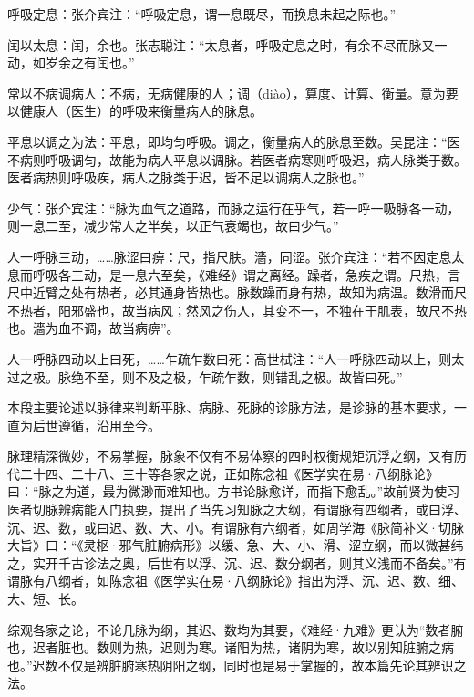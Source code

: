 \documentclass[12pt]{ctexbook}
\begin{document}
\begin{jiaozhu}
  \item 呼吸定息：张介宾注：“呼吸定息，谓一息既尽，而换息未起之际也。”
  \item 闰以太息：闰，余也。张志聪注：“太息者，呼吸定息之时，有余不尽而脉又一动，如岁余之有闰也。”
  \item 常以不病调病人：不病，无病健康的人；调（diào），算度、计算、衡量。意为要以健康人（医生）的呼吸来衡量病人的脉息。
  \item 平息以调之为法：平息，即均匀呼吸。调之，衡量病人的脉息至数。吴昆注：“医不病则呼吸调匀，故能为病人平息以调脉。若医者病寒则呼吸迟，病人脉类于数。医者病热则呼吸疾，病人之脉类于迟，皆不足以调病人之脉也。”
  \item 少气：张介宾注：“脉为血气之道路，而脉之运行在乎气，若一呼一吸脉各一动，则一息二至，减少常人之半矣，以正气衰竭也，故曰少气。”
  \item 人一呼脉三动，……脉涩曰痹：尺，指尺肤。濇，同涩。张介宾注：“若不因定息太息而呼吸各三动，是一息六至矣，《难经》谓之离经。躁者，急疾之谓。尺热，言尺中近臂之处有热者，必其通身皆热也。脉数躁而身有热，故知为病温。数滑而尺不热者，阳邪盛也，故当病风；然风之伤人，其变不一，不独在于肌表，故尺不热也。濇为血不调，故当病痹”。
  \item 人一呼脉四动以上曰死，……乍疏乍数曰死：高世栻注：“人一呼脉四动以上，则太过之极。脉绝不至，则不及之极，乍疏乍数，则错乱之极。故皆曰死。”
\end{jiaozhu}



本段主要论述以脉律来判断平脉、病脉、死脉的诊脉方法，是诊脉的基本要求，一直为后世遵循，沿用至今。

脉理精深微妙，不易掌握，脉象不仅有不易体察的四时权衡规矩沉浮之纲，又有历代二十四、二十八、三十等各家之说，正如陈念祖《医学实在易·八纲脉论》曰：“脉之为道，最为微渺而难知也。方书论脉愈详，而指下愈乱。”故前贤为使习医者切脉辨病能入门执要，提出了当先习知脉之大纲，有谓脉有四纲者，或曰浮、沉、迟、数，或曰迟、数、大、小。有谓脉有六纲者，如周学海《脉简补义·切脉大旨》曰：“《灵枢·邪气脏腑病形》以缓、急、大、小、滑、涩立纲，而以微甚纬之，实开千古诊法之奥，后世有以浮、沉、迟、数分纲者，则其义浅而不备矣。”有谓脉有八纲者，如陈念祖《医学实在易·八纲脉论》指出为浮、沉、迟、数、细、大、短、长。

综观各家之论，不论几脉为纲，其迟、数均为其要，《难经·九难》更认为“数者腑也，迟者脏也。数则为热，迟则为寒。诸阳为热，诸阴为寒，故以别知脏腑之病也。”迟数不仅是辨脏腑寒热阴阳之纲，同时也是易于掌握的，故本篇先论其辨识之法。
\end{document}
